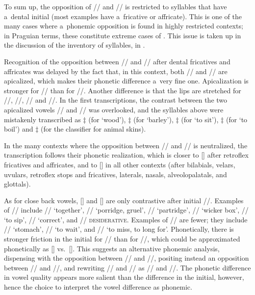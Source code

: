 		To sum up, the opposition of // and // is restricted to syllables that have a~dental initial (most examples have a~fricative or affricate). This is one of the many cases
		where a~phonemic opposition is found in highly restricted contexts; in Praguian terms, these
		constitute extreme cases of . This issue is taken up in the discussion of the
		inventory of syllables, in .
		
		Recognition of the opposition between // and // after dental fricatives and affricates was delayed by the fact that, in this context, both // and // are apicalized, which makes their phonetic difference a~very fine
		one. Apicalization is stronger for // than for //. Another difference is that the lips
		are stretched for //, //, // and //. In the first
		transcriptions, the contrast between the two apicalized vowels // and // was
		overlooked, and the syllables above were mistakenly transcribed as $\ddagger${\kern2pt} (for ‘wood’),
		$\ddagger${\kern2pt} (for ‘barley’), $\ddagger${\kern2pt} (for ‘to sit’), $\ddagger${\kern2pt} (for ‘to boil’) and
		$\ddagger${\kern2pt} (for the classifier for animal skins). 
		
		In the many contexts where the opposition
		between // and // is neutralized, the transcription follows their phonetic
		realization, which is closer to [] after retroflex fricatives and affricates, and to
		[] in all other contexts (after bilabials, velars, uvulars, retroflex stops and fricatives, laterals,
		nasals, alveolopalatals, and glottals).
		
		As for close back vowels, [] and [] are only contrastive after initial //. Examples of // include // ‘together’, //
		‘porridge, gruel’,	// ‘partridge’, // ‘wicker box’, // ‘to sip’, // ‘correct’, and \mbox{//} \textsc{desiderative}. Examples of // are fewer;
		they include // ‘stomach’, // ‘to wait’, and // ‘to miss, to long
		for’. Phonetically, there is
		stronger friction in the initial for // than for //, which could be approximated phonetically as
		[] vs.\ []. This suggests an alternative phonemic analysis, dispensing with the opposition between // and //,  positing instead an opposition between // and //, and rewriting // and // as // and //. The phonetic difference in vowel quality appears more salient than the difference in the initial, however, hence the choice to interpret the vowel difference as phonemic. 
		

